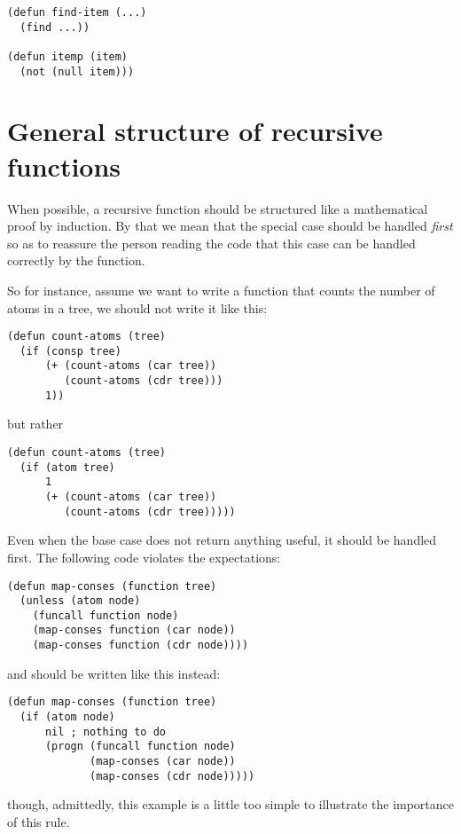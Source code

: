\begin{verbatim}
(defun find-item (...)
  (find ...))

(defun itemp (item)
  (not (null item)))
\end{verbatim}

\section{General structure of recursive functions}

When possible, a recursive function should be structured like a
mathematical proof by induction.  By that we mean that the special
case should be handled \emph{first} so as to reassure the person
reading the code that this case can be handled correctly by the
function.


So for instance, assume we want to write a function that counts
the number of atoms in a tree, we should not write it like this:

\begin{verbatim}
(defun count-atoms (tree)
  (if (consp tree)
      (+ (count-atoms (car tree))
         (count-atoms (cdr tree)))
      1))
\end{verbatim}

but rather

\begin{verbatim}
(defun count-atoms (tree)
  (if (atom tree)
      1
      (+ (count-atoms (car tree))
         (count-atoms (cdr tree)))))
\end{verbatim}

Even when the base case does not return anything useful, it should be
handled first.  The following code violates the expectations:

\begin{verbatim}
(defun map-conses (function tree)
  (unless (atom node)
    (funcall function node)
    (map-conses function (car node))
    (map-conses function (cdr node))))
\end{verbatim}

and should be written like this instead:

\begin{verbatim}
(defun map-conses (function tree)
  (if (atom node)
      nil ; nothing to do
      (progn (funcall function node)
             (map-conses (car node))
             (map-conses (cdr node)))))
\end{verbatim}

though, admittedly, this example is a little too simple to illustrate
the importance of this rule.

